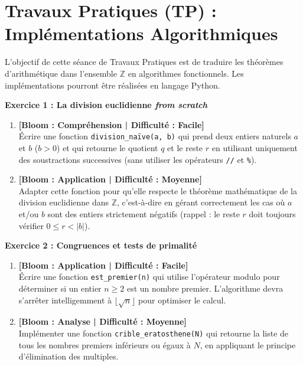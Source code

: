 \section*{Travaux Pratiques (TP) : Implémentations Algorithmiques}

\vspace{0.5cm}
\noindent L'objectif de cette séance de Travaux Pratiques est de traduire les théorèmes d'arithmétique dans l'ensemble $\mathbb{Z}$ en algorithmes fonctionnels. Les implémentations pourront être réalisées en langage Python.

\vspace{0.5cm}

\noindent\textbf{Exercice 1 : La division euclidienne \textit{from scratch}} 
\begin{enumerate}
    \item \textbf{[Bloom : Compréhension | Difficulté : Facile]} \\
    Écrire une fonction \texttt{division\_naïve(a, b)} qui prend deux entiers naturels $a$ et $b$ ($b > 0$) et qui retourne le quotient $q$ et le reste $r$ en utilisant uniquement des soustractions successives (sans utiliser les opérateurs \texttt{//} et \texttt{\%}).
    \item \textbf{[Bloom : Application | Difficulté : Moyenne]} \\
    Adapter cette fonction pour qu'elle respecte le théorème mathématique de la division euclidienne dans $\mathbb{Z}$, c'est-à-dire en gérant correctement les cas où $a$ et/ou $b$ sont des entiers strictement négatifs (rappel : le reste $r$ doit toujours vérifier $0 \le r < |b|$).
\end{enumerate}

\vspace{0.5cm}

\noindent\textbf{Exercice 2 : Congruences et tests de primalité} 
\begin{enumerate}
    \item \textbf{[Bloom : Application | Difficulté : Facile]} \\
    Écrire une fonction \texttt{est\_premier(n)} qui utilise l'opérateur modulo pour déterminer si un entier $n \ge 2$ est un nombre premier. L'algorithme devra s'arrêter intelligemment à $\lfloor\sqrt{n}\rfloor$ pour optimiser le calcul.
    \item \textbf{[Bloom : Analyse | Difficulté : Moyenne]} \\
    Implémenter une fonction \texttt{crible\_eratosthene(N)} qui retourne la liste de tous les nombres premiers inférieurs ou égaux à $N$, en appliquant le principe d'élimination des multiples.
\end{enumerate}

